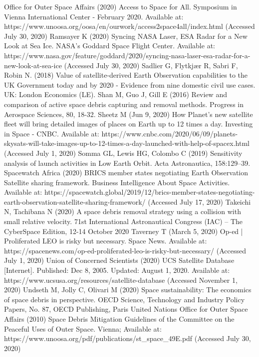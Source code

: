 \documentclass[12pt,a4paper,notitlepage,oneside,openright]{report}
\begin{document}
\begin{thebibliography}{100}
 Office for Outer Space Affairs (2020) Access to Space for All. Symposium in Vienna International Center - February 2020. Available at: https://www.unoosa.org/oosa/en/ourwork/access2space4all/index.html (Accessed July 30, 2020)
 Ramsayer K (2020) Syncing NASA Laser, ESA Radar for a New Look at Sea Ice. NASA's Goddard Space Flight Center. Available at: https://www.nasa.gov/feature/goddard/2020/syncing-nasa-laser-esa-radar-for-a-new-look-at-sea-ice (Accessed July 30, 2020)
 Sadlier G, Flytkjær R, Sabri F, Robin N. (2018) Value of satellite-derived Earth Observation capabilities to the UK Government today and by 2020 - Evidence from nine domestic civil use cases. UK: London Economics (LE).
 Shan M, Guo J, Gill E (2016) Review and comparison of active space debris capturing and removal methods. Progress in Aerospace Sciences, 80, 18-32.
 Sheetz M (Jun 9, 2020) How Planet’s new satellite fleet will bring detailed images of places on Earth up to 12 times a day. Investing in Space - CNBC. Available at: https://www.cnbc.com/2020/06/09/planets-skysats-will-take-images-up-to-12-times-a-day-launched-with-help-of-spacex.html (Accessed July 1, 2020)
 Somma GL, Lewis HG, Colombo C (2019) Sensitivity analysis of launch activities in Low Earth Orbit. Acta Astronautica, 158:129–39.
 Spacewatch Africa (2020) BRICS member states negotiating Earth Observation Satellite sharing framework. Business Intelligence About Space Activities. Available at: https://spacewatch.global/2019/12/brics-member-states-negotiating-earth-observation-satellite-sharing-framework/ (Accessed July 17, 2020)
 Takeichi N, Tachibana N (2020) A space debris removal strategy using a collision with small relative velocity. 71st International Astronautical Congress (IAC) – The CyberSpace Edition, 12-14 October 2020
 Taverney T (March 5, 2020) Op-ed | Proliferated LEO is risky but necessary. Space News. Available at: https://spacenews.com/op-ed-proliferated-leo-is-risky-but-necessary/ (Accessed July 1, 2020)
 Union of Concerned Scientists (2020) UCS Satellite Database [Internet]. Published: Dec 8, 2005. Updated: August 1, 2020. Available at: https://www.ucsusa.org/resources/satellite-database (Accessed November 1, 2020)
 Undseth M, Jolly C, Olivari M (2020) Space sustainability: The economics of space debris in perspective. OECD Science, Technology and Industry Policy Papers, No. 87, OECD Publishing, Paris
 United Nations Office for Outer Space Affairs (2010) Space Debris Mitigation Guidelines of the Committee on the Peaceful Uses of Outer Space. Vienna; Available at: https://www.unoosa.org/pdf/publications/st_space_49E.pdf (Accessed July 30, 2020)

\end{thebibliography}
\end{document}
